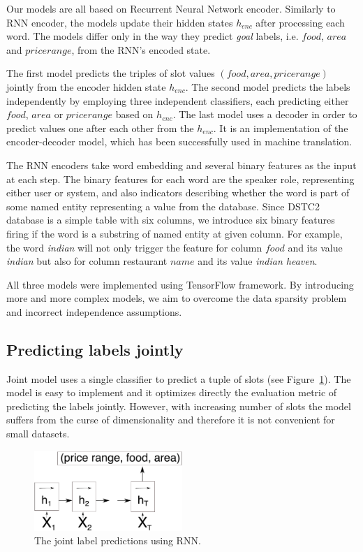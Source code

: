 \documentclass{itatnew}
\begin{document}
Our models are all based on Recurrent Neural Network encoder\cite{werbos1990backpropagation}. Similarly to RNN encoder\cite{zilka2015incremental}, the models update their hidden states $h_{enc}$ after processing each word.
The models differ only in the way they predict {\it goal} labels, i.e. $food$, $area$ and $price range$, from the RNN's encoded state.

The first model predicts the triples of slot values $(food, area, price range)$ jointly from the encoder hidden state $h_{enc}$.
The second model predicts the labels independently by employing three independent classifiers, each predicting either $food$, $area$ or $price range$ based on $h_{enc}$.
The last model uses a decoder in order to predict values one after each other from the $h_{enc}$. It is an implementation of the encoder-decoder model, which has been successfully used in machine translation\cite{bahdanau2014neural}.

The RNN encoders take word embedding and several binary features as the input at each step.
The binary features for each word are the speaker role, representing either user or system, and also indicators describing whether the word is part of some named entity representing a value from the database.
Since DSTC2 database is a simple table with six columns, we introduce six binary features firing if the word is a substring of named entity at given column.
For example, the word {\it indian} will not only trigger the feature for column $food$ and its value {\it indian} but also for column restaurant $name$ and its value {\it indian heaven}.

All three models were implemented using TensorFlow\cite{abaditensorflow} framework. By introducing more and more complex models, we aim to overcome the data sparsity problem and incorrect independence assumptions.

\subsection{Predicting labels jointly}
\label{sec:joint}
Joint model uses a single classifier to predict a tuple of slots (see Figure~\ref{fig:encjoint}).
The model is easy to implement and it optimizes directly the evaluation metric of predicting the labels jointly.
However, with increasing number of slots the model suffers from the curse of dimensionality and therefore it is not convenient for small datasets.
\begin{figure}
\includegraphics[width=0.5\textwidth]{encoder_joint}
\caption{The joint label predictions using RNN.}
\label{fig:encjoint}
\end{figure}
\end{document}
